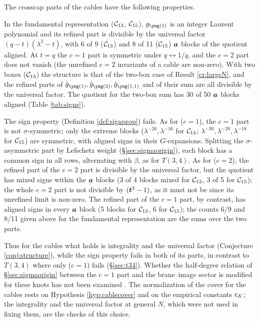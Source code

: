 \begin{result}\label{cr:cable-largeN}
The crosscap parts of the cables have the following properties.

In the fundamental representation ($\mathcal{C}_{13}$, $\mathcal{C}_{15}$), $g_{\yone}$ is an integer Laurent polynomial and its refined part is divisible by the universal factor $(q-t)(\lambda^2-t)$, with 6 of 9 ($\mathcal{C}_{13}$) and 8 of 11 ($\mathcal{C}_{15}$) $\bm{a}$ blocks of the quotient aligned. At $t = q$ the $c = 1$ part is symmetric under $q \leftrightarrow 1/q$, and the $c = 2$ part does not vanish (the unrefined $c = 2$ invariants of a cable are non-zero).
With two boxes ($\mathcal{C}_{13}$) the structure is that of the two-box case of Result \ref{cr:largeN}, and the refined parts of $\hat g_{\yone}, \hat g_{\ytwo}, \hat g_{\yoneone}$ and of their sum are all divisible by the universal factor. The quotient for the two-box sum has 30 of 50 $\bm{a}$ blocks aligned (Table \ref{tab:signs}).

The sign property (Definition \ref{def:signprop}) fails. As for ($c{=}1$), the $c = 1$ part is not $\sigma$-symmetric; only the extreme blocks ($\lambda^{-26}, \lambda^{-16}$ for $\mathcal{C}_{13}$; $\lambda^{-30}, \lambda^{-28}, \lambda^{-18}$ for $\mathcal{C}_{15}$) are symmetric, with aligned signs in their $G$-expansions. Splitting the $\sigma$-asymmetric part by Lefschetz weight (\S\ref{sec:sigmaorigin}), each block has a common sign in all rows, alternating with $\beta$, as for $T(3,4)$. As for ($c{=}2$), the refined part of the $c = 2$ part is divisible by the universal factor, but the quotient has mixed signs within the $\bm{a}$ blocks (3 of 4 blocks mixed for $\mathcal{C}_{13}$, 3 of 5 for $\mathcal{C}_{15}$); the whole $c = 2$ part is not divisible by $(\bm{t}^2 - 1)$, as it must not be since its unrefined limit is non-zero. The refined part of the $c = 1$ part, by contrast, has aligned signs in every $\bm{a}$ block (5 blocks for $\mathcal{C}_{13}$, 6 for $\mathcal{C}_{15}$); the counts 6/9 and 8/11 given above for the fundamental representation are the sums over the two parts.
\end{result}
Thus for the cables what holds is integrality and the universal factor (Conjecture \ref{conj:structure}), while the sign property fails in both of its parts, in contrast to $T(3,4)$ where only ($c{=}1$) fails (\S\ref{sec:t34}). Whether the half-degree relation of \S\ref{sec:sigmaorigin} between the $c = 1$ part and the brane--image sector is modified for these knots has not been examined \open. The normalization of the cover for the cables rests on Hypothesis \ref{hyp:cablecover} and on the empirical constants $\mathsf{c}_K$; the integrality and the universal factor at general $N$, which were not used in fixing them, are the checks of this choice.
